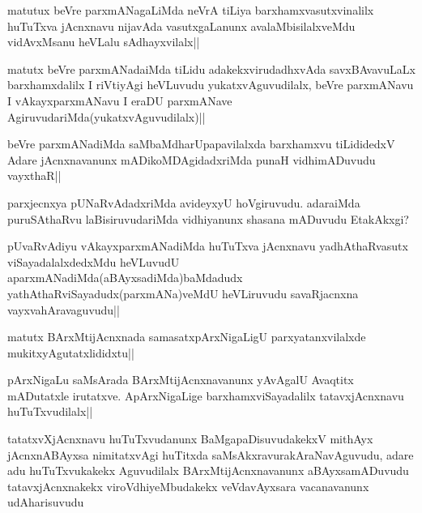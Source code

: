 \begin{artha}
matutux beVre parxmANagaLiMda neVrA tiLiya barxhamxvasutxvinalilx huTuTxva jAcnxnavu nijavAda vasutxgaLanunx avalaMbisilalxveMdu vidAvxMsanu heVLalu sAdhayxvilalx||
\end{artha}


\begin{artha}
matutx beVre parxmANadaiMda tiLidu adakekxvirudadhxvAda savxBAvavuLaLx barxhamxdalilx I riVtiyAgi heVLuvudu yukatxvAguvudilalx, beVre parxmANavu I vAkayxparxmANavu I eraDU parxmANave AgiruvudariMda(yukatxvAguvudilalx)||
\end{artha}

\begin{artha}
beVre parxmANadiMda saMbaMdharUpapavilalxda barxhamxvu tiLididedxV Adare jAcnxnavanunx mADikoMDAgidadxriMda punaH vidhimADuvudu vayxthaR||
\end{artha}


\begin{artha}
parxjecnxya pUNaRvAdadxriMda avideyxyU hoVgiruvudu. adaraiMda puruSAthaRvu laBisiruvudariMda vidhiyanunx shasana mADuvudu EtakAkxgi?
\end{artha}


\begin{artha}
pUvaRvAdiyu vAkayxparxmANadiMda huTuTxva jAcnxnavu yadhAthaRvasutx viSayadalalxdedxMdu heVLuvudU aparxmANadiMda(aBAyxsadiMda)baMdadudx yathAthaRviSayadudx(parxmANa)veMdU heVLiruvudu savaRjacnxna vayxvahAravaguvudu||
\end{artha}


\begin{artha}
matutx BArxMtijAcnxnada samasatxpArxNigaLigU parxyatanxvilalxde mukitxyAgutatxlididxtu||
\end{artha}

\begin{artha}
pArxNigaLu saMsArada BArxMtijAcnxnavanunx yAvAgalU Avaqtitx mADutatxle irutatxve. ApArxNigaLige barxhamxviSayadalilx tatavxjAcnxnavu huTuTxvudilalx||
\end{artha}

\begin{artha}
tatatxvXjAcnxnavu huTuTxvudanunx BaMgapaDisuvudakekxV mithAyx jAcnxnABAyxsa nimitatxvAgi huTitxda saMsAkxravurakAraNavAguvudu, adare adu huTuTxvukakekx Aguvudilalx BArxMtijAcnxnavanunx aBAyxsamADuvudu tatavxjAcnxnakekx viroVdhiyeMbudakekx veVdavAyxsara vacanavanunx udAharisuvudu
\end{artha}

